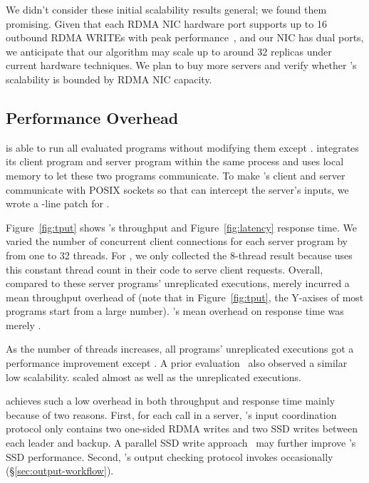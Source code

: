 We didn't consider these initial scalability results general; we found them
promising. Given that each RDMA NIC hardware port supports up to 16 outbound
RDMA WRITEs with peak performance~\cite{herd:sigcomm14}, and our NIC has dual
ports, we anticipate that our algorithm may scale up to around 32 replicas
under current hardware techniques. We plan to buy more servers and verify
whether \xxx's scalability is bounded by RDMA NIC capacity.


\subsection{Performance Overhead} \label{sec:overhead}


\xxx is able to run all \nprog evaluated programs without modifying them except
\calvin. \calvin integrates its client program and server program within the
same process and uses local memory to let these two programs communicate. To
make \calvin's client and server communicate with POSIX sockets so that \xxx
can intercept the server's inputs, we wrote a \nlinescalvin-line patch for
\calvin.

Figure~\ref{fig:tput} shows \xxx's throughput and Figure~\ref{fig:latency}
response time. We varied the number of concurrent client connections for each
server program by from one to 32 threads. For \calvin, we only collected the
8-thread result because \calvin uses this constant thread count in their code
to serve client requests. Overall, compared to these server programs'
unreplicated executions, \xxx merely incurred a mean throughput overhead of
\tputoverhead (note that in Figure~\ref{fig:tput}, the Y-axises of most programs
start from a large number). \xxx's mean overhead on response time was merely
\latencyoverhead.

As the number of threads increases, all programs' unreplicated executions
got a performance improvement except \memcached. A prior
evaluation~\cite{rex:eurosys14} also observed a similar \memcached low
scalability. \xxx scaled almost as well as the unreplicated executions.

\xxx achieves such a low overhead in both throughput and response time mainly
because of two reasons. First, for each \recv call in a server, \xxx's input
coordination protocol only contains two one-sided RDMA writes and two SSD writes
between each leader and backup. A parallel SSD write
approach~\cite{Bessani:usenix13} may further improve \xxx's SSD performance.
Second, \xxx's output checking protocol invokes occasionally
(\S\ref{sec:output-workflow}).

